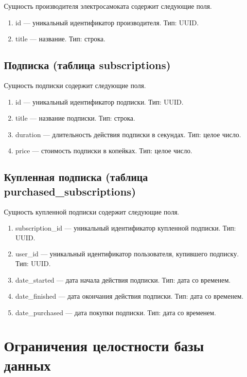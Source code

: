 Сущность производителя электросамоката содержит следующие поля.

\begin{enumerate}
	\item id --- уникальный идентификатор производителя. Тип: UUID.
	\item title --- название. Тип: строка.
\end{enumerate}

\subsection{Подписка (таблица subscriptions)}

Сущность подписки содержит следующие поля.

\begin{enumerate}
	\item id --- уникальный идентификатор подписки. Тип: UUID.
	\item title --- название подписки. Тип: строка.
	\item duration --- длительность действия подписки в секундах. Тип: целое число.
	\item price --- стоимость подписки в копейках. Тип: целое число.
\end{enumerate}

\subsection{Купленная подписка (таблица purchased\_subscriptions)}

Сущность купленной подписки содержит следующие поля.

\begin{enumerate}
	\item subscription\_id --- уникальный идентификатор купленной подписки. Тип: UUID.
	\item user\_id --- уникальный идентификатор пользователя, купившего подписку. Тип:
	      UUID.
	\item date\_started --- дата начала действия подписки. Тип: дата со временем.
	\item date\_finished --- дата окончания действия подписки. Тип: дата со временем.
	\item date\_purchased --- дата покупки подписки. Тип: дата со временем.
\end{enumerate}

\section{Ограничения целостности базы данных}

